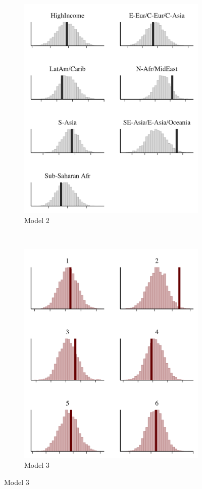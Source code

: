 \documentclass[10pt,handout]{beamer}
\begin{document}
\begin{frame}
\begin{figure}
\begin{subfigure}{.31\textwidth}
\includegraphics[width=\textwidth]{figs/ppc_med_grouped2.png}
\caption{Model 2}
\end{subfigure}
~
\begin{subfigure}{.31\textwidth}
\includegraphics[width=\textwidth]{figs/ppc_med_grouped3.png}
\caption{Model 3}
\end{subfigure}


\end{figure}
\end{frame}
\end{document}
